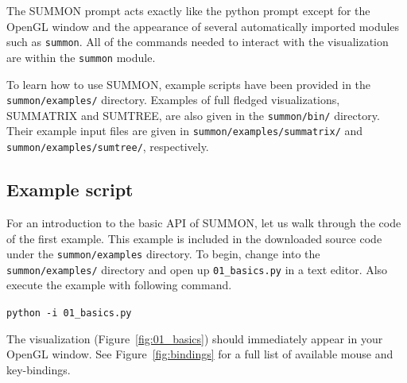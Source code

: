 \documentclass[12pt]{article}
\newcommand{\code}[1]{{\tt #1}}
\newcommand{\codeblock}[1]{\vspace{.1in} {\tt #1} \vspace{.1in}}
\newcommand{\figref}[1]{Figure~\ref{#1}}
\begin{document}
The SUMMON prompt acts exactly like the python prompt except for the OpenGL
window and the appearance of several automatically imported modules such as 
\code{summon}.  All of the commands needed to interact with the visualization
are within the \code{summon}  module.  

To learn how to use SUMMON, example scripts have been provided in the 
\code{summon/examples/} directory.  Examples of full fledged visualizations,
SUMMATRIX and SUMTREE, are also given in the \code{summon/bin/} directory. 
Their example input files are given in \code{summon/examples/summatrix/} and
\code{summon/examples/sumtree/}, respectively.



\subsection{Example script}

For an introduction to the basic API of SUMMON, let us walk through the
code of the first example.  This example is included in the downloaded
source code under the \code{summon/examples} directory.  To begin, change into the
\code{summon/examples/} directory and open up \code{01\_basics.py} in a
text editor.  Also execute the example with following command.

\codeblock{python -i 01\_basics.py}

The visualization (\figref{fig:01_basics}) should immediately appear in your
OpenGL window.  See \figref{fig:bindings} for a full list of available 
mouse and key-bindings.
\end{document}
